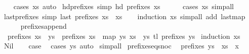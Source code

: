 \begin{isabellebody}
%
\isadelimproof
\ \ %
\endisadelimproof
%
\isatagproof
{}\isamarkupfalse%
\ {\isacharparenleft}cases\ xs{\isacharparenright}\ auto%
\endisatagproof
{\isafoldproof}%
%
\isadelimproof
\isanewline
%
\endisadelimproof
\isanewline
{}\isamarkupfalse%
\ hd{\isacharunderscore}prefixes\ {\isacharbrackleft}simp{\isacharbrackright}{\isacharcolon}\ {\isachardoublequoteopen}hd\ {\isacharparenleft}prefixes\ xs{\isacharparenright}\ {\isacharequal}\ {\isacharbrackleft}{\isacharbrackright}{\isachardoublequoteclose}\isanewline
%
\isadelimproof
\ \ %
\endisadelimproof
%
\isatagproof
{}\isamarkupfalse%
\ {\isacharparenleft}cases\ xs{\isacharparenright}\ simp{\isacharunderscore}all%
\endisatagproof
{\isafoldproof}%
%
\isadelimproof
\isanewline
%
\endisadelimproof
\isanewline
{}\isamarkupfalse%
\ last{\isacharunderscore}prefixes\ {\isacharbrackleft}simp{\isacharbrackright}{\isacharcolon}\ {\isachardoublequoteopen}last\ {\isacharparenleft}prefixes\ xs{\isacharparenright}\ {\isacharequal}\ xs{\isachardoublequoteclose}\isanewline
%
\isadelimproof
\ \ %
\endisadelimproof
%
\isatagproof
{}\isamarkupfalse%
\ {\isacharparenleft}induction\ xs{\isacharparenright}\ {\isacharparenleft}simp{\isacharunderscore}all\ add{\isacharcolon}\ last{\isacharunderscore}map{\isacharparenright}%
\endisatagproof
{\isafoldproof}%
%
\isadelimproof
\isanewline
%
\endisadelimproof
\ \ \ \ \isanewline
{}\isamarkupfalse%
\ prefixes{\isacharunderscore}append{\isacharcolon}\ \isanewline
\ \ {\isachardoublequoteopen}prefixes\ {\isacharparenleft}xs\ {\isacharat}\ ys{\isacharparenright}\ {\isacharequal}\ prefixes\ xs\ {\isacharat}\ map\ {\isacharparenleft}{\isasymlambda}ys{\isacharprime}{\isachardot}\ xs\ {\isacharat}\ ys{\isacharprime}{\isacharparenright}\ {\isacharparenleft}tl\ {\isacharparenleft}prefixes\ ys{\isacharparenright}{\isacharparenright}{\isachardoublequoteclose}\isanewline
%
\isadelimproof
%
\endisadelimproof
%
\isatagproof
{}\isamarkupfalse%
\ {\isacharparenleft}induction\ xs{\isacharparenright}\isanewline
\ \ \isamarkupfalse%
\ Nil\isanewline
\ \ \isamarkupfalse%
\ {\isacharquery}case\ \isamarkupfalse%
\ {\isacharparenleft}cases\ ys{\isacharparenright}\ auto\isanewline
{}\isamarkupfalse%
\ simp{\isacharunderscore}all%
\endisatagproof
{\isafoldproof}%
%
\isadelimproof
\isanewline
%
\endisadelimproof
\isanewline
{}\isamarkupfalse%
\ prefixes{\isacharunderscore}eq{\isacharunderscore}snoc{\isacharcolon}\isanewline
\ \ {\isachardoublequoteopen}prefixes\ ys\ {\isacharequal}\ xs\ {\isacharat}\ {\isacharbrackleft}x{\isacharbrackright}\ {\isasymlongleftrightarrow}\isanewline

\end{isabellebody}
